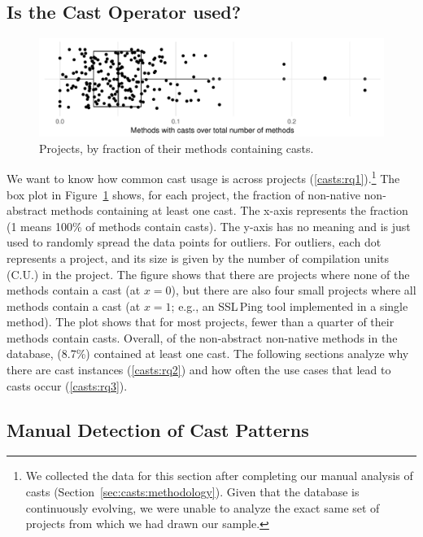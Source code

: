 \subsection{Is the Cast Operator used?}



\begin{figure}[ht!]
  \includegraphics[width=\columnwidth]{analysis/stats-methodwcastXproject.pdf}
  \caption{Projects, by fraction of their methods containing casts.}
  \label{fig:stats}
\end{figure}

We want to know how common cast usage is across projects (\ref{casts:rq1}).\footnote{
We collected the data for this section after completing our manual analysis of
casts (Section~\ref{sec:casts:methodology}).
Given that the \lgtm{} database is continuously evolving,
we were unable to analyze the exact same set of projects from which we had drawn our sample.
}
The box plot in Figure~\ref{fig:stats} shows, for each project,
the fraction of non-native non-abstract methods containing at least one cast.
The x-axis represents the fraction (1 means 100\% of methods contain casts).
The y-axis has no meaning and is just used to randomly spread the data points for outliers.
For outliers, each dot represents a project,
and its size is given by the number of compilation units (C.U.) in the project.
The figure shows that there are projects
where none of the methods contain a cast (at $x=0$),
but there are also four small projects
where all methods contain a cast (at $x=1$;
e.g., an SSL\,Ping tool implemented in a single method).
The plot shows that for most projects, fewer than a quarter of their methods contain casts.
Overall, of the \nmethod{} non-abstract non-native methods in the database,
\nmethodwithcast{} (8.7\%) contained at least one cast.
The following sections analyze why there are cast instances (\ref{casts:rq2})
and how often the use cases that lead to casts occur (\ref{casts:rq3}).


\subsection{Manual Detection of Cast Patterns}

